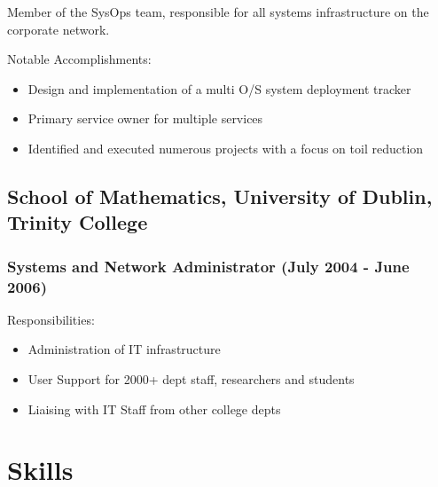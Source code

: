 \documentclass[a4paper, 10pt] {article}
\begin{document}
Member of the SysOps team, responsible for all systems infrastructure on the corporate network.

\vspace{4mm}  %

Notable Accomplishments:

\begin{itemize}[itemsep=2pt,parsep=2pt]
  \item Design and implementation of a multi O/S system deployment tracker
  \item Primary service owner for multiple services
  \item Identified and executed numerous projects with a focus on toil reduction
\end{itemize}

\subsection*{School of Mathematics, University of Dublin, Trinity College}

\subsubsection*{Systems and Network Administrator (July 2004 - June 2006)}

Responsibilities:

\begin{itemize}[itemsep=2pt,parsep=2pt]
  \item Administration of IT infrastructure
  \item User Support for 2000+ dept staff, researchers and students
  \item Liaising with IT Staff from other college depts
\end{itemize}

\hrulefill

\section*{Skills}
\end{document}
